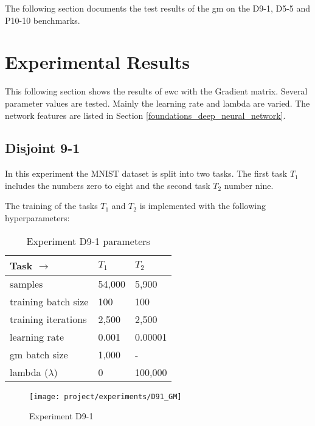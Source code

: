 The following section documents the test results of the \acrlong{gm} on the D9-1, D5-5 and P10-10 benchmarks.

\newpage
\section{Experimental Results}

This following section shows the results of \acrshort{ewc} with the Gradient matrix.
Several parameter values are tested.
Mainly the learning rate and lambda are varied.
The network features are listed in Section \ref{foundations_deep_neural_network}.

\subsection{Disjoint 9-1}

In this experiment the MNIST dataset is split into two tasks.
The first task $T_1$ includes the numbers zero to eight and the second task $T_2$ number nine.

The training of the tasks $T_1$ and $T_2$ is implemented with the following hyperparameters:

\begin{table}[H]
    \centering
    \begin{tabular}{ |l|l|l|  }
        \hline
        Task $\to$ & $T_1$ & $T_2$ \\
        \hline\hline
        samples & 54,000 & 5,900 \\
        \hline
        training batch size & 100 & 100 \\
        \hline
        training iterations & 2,500 & 2,500 \\
        \hline
        learning rate & 0.001 & 0.00001 \\
        \hline
        \acrshort{gm} batch size & 1,000 & - \\
        \hline
        lambda ($\lambda$) & 0 & 100,000 \\
        \hline
    \end{tabular}
    \caption{Experiment D9-1 parameters}
    \label{table:exp_d91_params}
\end{table}

\begin{figure}[H]
    \centering
    \texttt{[image: project/experiments/D91\_GM]}
    \caption{Experiment D9-1}
    \label{fig:exp_d9-1_bs1k}
\end{figure}

